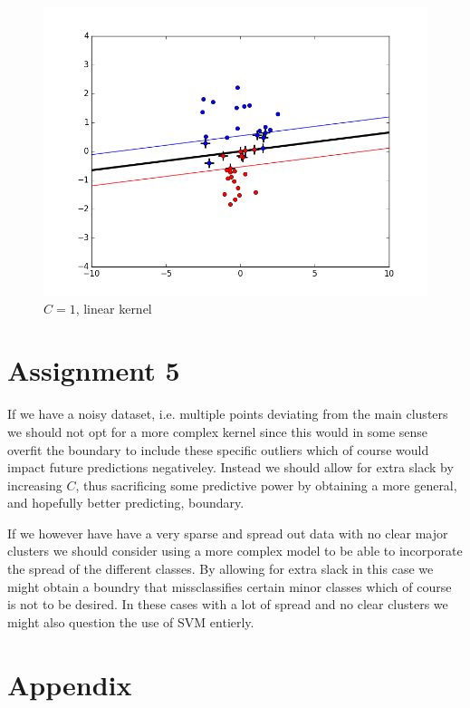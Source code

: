 \documentclass{article}
\begin{document}
\begin{figure}[H]
\centering
\includegraphics[scale = 0.5]{figure_linear_slack1.png}
\caption{$C=1$, linear kernel}
\label{fig:7}
\end{figure}


\section*{Assignment 5}

If we have a noisy dataset, i.e. multiple points deviating from the main clusters we should not opt for a more complex kernel since this would in some sense overfit the boundary to include these specific outliers which of course would impact future predictions negativeley. Instead we should allow for extra slack by increasing $C$, thus sacrificing some predictive power by obtaining a more general, and hopefully better predicting, boundary. 

If we however have have a very sparse and spread out data with no clear major clusters we should consider using a more complex model to be able to incorporate the spread of the different classes. By allowing for extra slack in this case we might obtain a boundry that missclassifies certain minor classes which of course is not to be desired. In these cases with a lot of spread and no clear clusters we might also question the use of SVM entierly.

\section*{Appendix}
\end{document}
